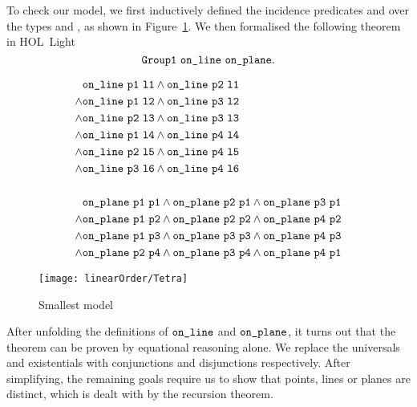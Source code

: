 To check our model, we first inductively defined the incidence predicates  and  over the types  and , as shown in Figure~\ref{fig:SmallestModel}. We then formalised the following theorem in HOL~Light 
\begin{displaymath}
\code{Group1}\ \code{on\_line}\ \code{on\_plane}.
\end{displaymath}

\begin{figure}
\begin{minipage}[c]{4cm}
\begin{align*}
& \texttt{on\_line}\ \texttt{p1}\ \texttt{l1}\wedge \texttt{on\_line}\ \texttt{p2}\ \texttt{l1}\\
\wedge & \texttt{on\_line}\ \texttt{p1}\ \texttt{l2}\wedge \texttt{on\_line}\ \texttt{p3}\ \texttt{l2}\\
\wedge & \texttt{on\_line}\ \texttt{p2}\ \texttt{l3}\wedge \texttt{on\_line}\ \texttt{p3}\ \texttt{l3}\\
\wedge & \texttt{on\_line}\ \texttt{p1}\ \texttt{l4}\wedge \texttt{on\_line}\ \texttt{p4}\ \texttt{l4}\\
\wedge & \texttt{on\_line}\ \texttt{p2}\ \texttt{l5}\wedge \texttt{on\_line}\ \texttt{p4}\ \texttt{l5}\\
\wedge & \texttt{on\_line}\ \texttt{p3}\ \texttt{l6}\wedge \texttt{on\_line}\ \texttt{p4}\ \texttt{l6}\\
\\
& \texttt{on\_plane}\ \texttt{p1}\ \texttt{p1}\wedge \texttt{on\_plane}\ \texttt{p2}\ \texttt{p1}\wedge \texttt{on\_plane}\ \texttt{p3}\ \texttt{p1}\\
\wedge & \texttt{on\_plane}\ \texttt{p1}\ \texttt{p2}\wedge \texttt{on\_plane}\ \texttt{p2}\ \texttt{p2}\wedge \texttt{on\_plane}\ \texttt{p4}\ \texttt{p2}\\
\wedge & \texttt{on\_plane}\ \texttt{p1}\ \texttt{p3}\wedge \texttt{on\_plane}\ \texttt{p3}\ \texttt{p3}\wedge \texttt{on\_plane}\ \texttt{p4}\ \texttt{p3}\\
\wedge & \texttt{on\_plane}\ \texttt{p2}\ \texttt{p4}\wedge \texttt{on\_plane}\ \texttt{p3}\ \texttt{p4}\wedge \texttt{on\_plane}\ \texttt{p4}\ \texttt{p1}
\end{align*}\end{minipage}\centering\texttt{[image: linearOrder/Tetra]}
\caption{Smallest model}\label{fig:SmallestModel}
\end{figure}

After unfolding the definitions of $\texttt{on\_line}$ and $\texttt{on\_plane}$, it turns out that the theorem can be proven by equational reasoning alone. We replace the universals and existentials with conjunctions and disjunctions respectively. After simplifying, the remaining goals require us to show that points, lines or planes are distinct, which is dealt with by the recursion theorem.

